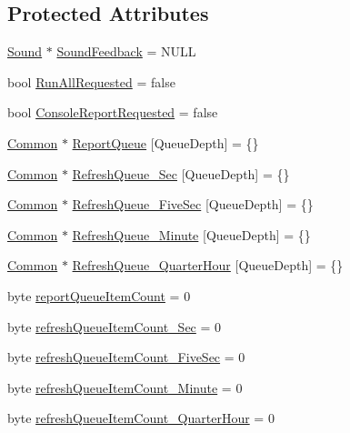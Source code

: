 \subsection*{Protected Attributes}
\begin{DoxyCompactItemize}
\item 
\hyperlink{class_sound}{Sound} $\ast$ \hyperlink{class_module_ad1d2c51311e5b4a5e80d90d0eeb3cf34}{Sound\+Feedback} = N\+U\+LL
\item 
bool \hyperlink{class_module_a260dfc24cf7730c9f0172d83f3aa4419}{Run\+All\+Requested} = false
\item 
bool \hyperlink{class_module_a08a9203994efe62913dbc720ea8744c2}{Console\+Report\+Requested} = false
\item 
\hyperlink{class_common}{Common} $\ast$ \hyperlink{class_module_aaabe242421b7026a5ccca209b20f0081}{Report\+Queue} \mbox{[}Queue\+Depth\mbox{]} = \{\}
\item 
\hyperlink{class_common}{Common} $\ast$ \hyperlink{class_module_a46cbdbd5adcfae66d08dda6770b5f524}{Refresh\+Queue\+\_\+\+Sec} \mbox{[}Queue\+Depth\mbox{]} = \{\}
\item 
\hyperlink{class_common}{Common} $\ast$ \hyperlink{class_module_a5742bb29957fae32eab1d58b2a802be4}{Refresh\+Queue\+\_\+\+Five\+Sec} \mbox{[}Queue\+Depth\mbox{]} = \{\}
\item 
\hyperlink{class_common}{Common} $\ast$ \hyperlink{class_module_a5902ea6a8356064bea5153c8dac2ae4c}{Refresh\+Queue\+\_\+\+Minute} \mbox{[}Queue\+Depth\mbox{]} = \{\}
\item 
\hyperlink{class_common}{Common} $\ast$ \hyperlink{class_module_ae1973bee6cfa7e4683682854bb324314}{Refresh\+Queue\+\_\+\+Quarter\+Hour} \mbox{[}Queue\+Depth\mbox{]} = \{\}
\item 
byte \hyperlink{class_module_a6405c5d2c2f2560293a14e59b1b4cff9}{report\+Queue\+Item\+Count} = 0
\item 
byte \hyperlink{class_module_ae05fd09c3790b471523bb1dc60439432}{refresh\+Queue\+Item\+Count\+\_\+\+Sec} = 0
\item 
byte \hyperlink{class_module_af16e616b4816e8f68d7f57072391b0ce}{refresh\+Queue\+Item\+Count\+\_\+\+Five\+Sec} = 0
\item 
byte \hyperlink{class_module_aeffa1762c08e74746dadbae5f4bfd6b3}{refresh\+Queue\+Item\+Count\+\_\+\+Minute} = 0
\item 
byte \hyperlink{class_module_af5bb56f3eea014805063b5b0e10b7133}{refresh\+Queue\+Item\+Count\+\_\+\+Quarter\+Hour} = 0
\end{DoxyCompactItemize}


